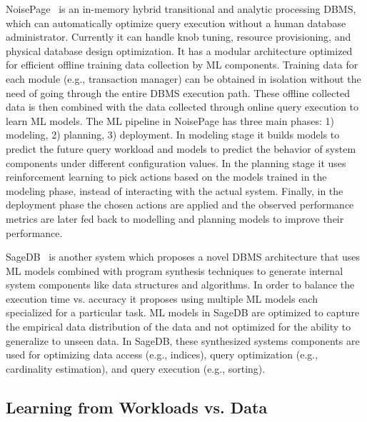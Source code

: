NoisePage~\cite{noisepage} is an in-memory  hybrid transitional and analytic processing DBMS, which can automatically optimize query execution without a human database administrator.
Currently it can handle knob tuning, resource provisioning, and physical database design optimization.
It has a modular architecture optimized for efficient offline training data collection by ML components.
Training data for each module (e.g., transaction manager) can be obtained in isolation without the need of going through the entire DBMS execution path.
These offline collected data is then combined with the data collected through online query execution to learn ML models.
The ML pipeline in NoisePage has three main phases: 1) modeling, 2) planning, 3) deployment.
In modeling stage it builds models to predict the future query workload and models to predict the behavior of system components under different configuration values.
In the planning stage it uses reinforcement learning to pick actions based on the models trained in the modeling phase, instead of interacting with the actual system.
Finally, in the deployment phase the chosen actions are applied and the observed performance metrics are later fed back to modelling and planning models to improve their performance.

SageDB~\cite{sagedb} is another system which proposes a novel DBMS architecture that uses ML models combined with program synthesis techniques to generate internal system components like data structures and algorithms.
In order to balance the execution time vs. accuracy it proposes using multiple ML models each specialized for a particular task.
ML models in SageDB are optimized to capture the empirical data distribution of the data and not optimized for the ability to generalize to unseen data.
In SageDB, these synthesized systems components are  used for optimizing data access (e.g., indices), query optimization (e.g., cardinality estimation), and query execution (e.g., sorting).


\subsection{Learning from Workloads vs. Data}
